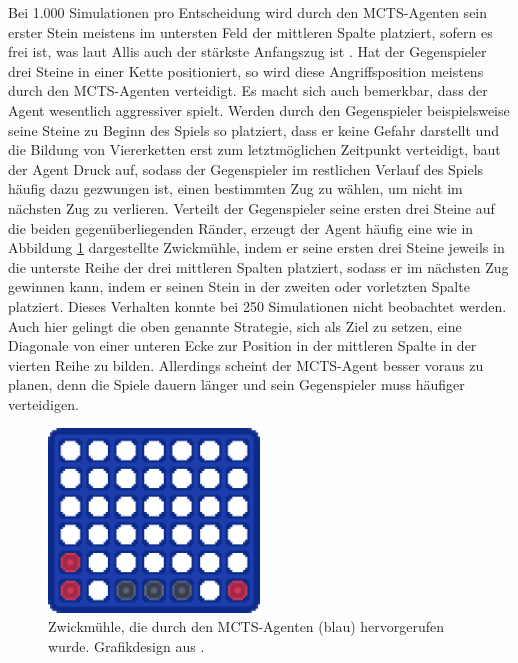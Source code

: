 Bei 1.000 Simulationen pro Entscheidung wird durch den MCTS-Agenten sein erster Stein meistens im untersten Feld der mittleren Spalte platziert, sofern es frei ist, was laut Allis auch der stärkste Anfangszug ist \cite{Allis.1988}. Hat der Gegenspieler drei Steine in einer Kette positioniert, so wird diese Angriffsposition meistens durch den MCTS-Agenten verteidigt. Es macht sich auch bemerkbar, dass der Agent wesentlich aggressiver spielt. Werden durch den Gegenspieler beispielsweise seine Steine zu Beginn des Spiels so platziert, dass er keine Gefahr darstellt und die Bildung von Viererketten erst zum letztmöglichen Zeitpunkt verteidigt, baut der Agent Druck auf, sodass der Gegenspieler im restlichen Verlauf des Spiels häufig dazu gezwungen ist, einen bestimmten Zug zu wählen, um nicht im nächsten Zug zu verlieren. Verteilt der Gegenspieler seine ersten drei Steine auf die beiden gegenüberliegenden Ränder, erzeugt der Agent häufig eine wie in Abbildung \ref{fig:f24} dargestellte Zwickmühle, indem er seine ersten drei Steine jeweils in die unterste Reihe der drei mittleren Spalten platziert, sodass er im nächsten Zug gewinnen kann, indem er seinen Stein in der zweiten oder vorletzten Spalte platziert. Dieses Verhalten konnte bei 250 Simulationen nicht beobachtet werden. Auch hier gelingt die oben genannte Strategie, sich als Ziel zu setzen, eine Diagonale von einer unteren Ecke zur Position in der mittleren Spalte in der vierten Reihe zu bilden. Allerdings scheint der MCTS-Agent besser voraus zu planen, denn die Spiele dauern länger und sein Gegenspieler muss häufiger verteidigen.

\begin{figure}
	\includegraphics[width=0.5\textwidth, center]{Bilder/connect-four-boards/zwickmuehle.png}
	\caption[Zwickmühle, die durch den MCTS-Agenten (blau) hervorgerufen wurde.]{Zwickmühle, die durch den MCTS-Agenten (blau) hervorgerufen wurde. Grafikdesign aus \cite{Farama.2025}.}
	\label{fig:f24}
\end{figure}

